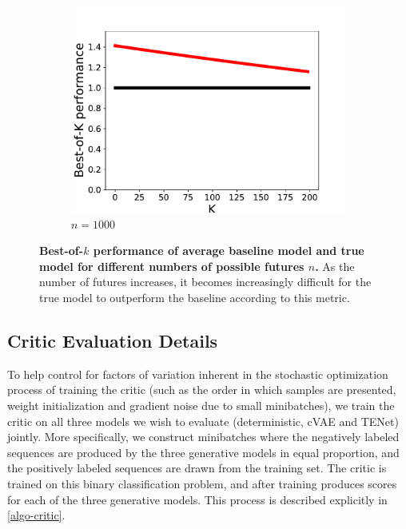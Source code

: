 \documentclass{article}
\begin{document}
\begin{appendices}
\begin{figure}
    \begin{subfigure}[b]{0.3\textwidth}
      \includegraphics[width=\textwidth]{images/best_of_k_toy_n1000.pdf}
      \caption{$n=1000$}
      \label{fig:mouse}
    \end{subfigure}
    \caption{
      \textbf{Best-of-$k$ performance of average baseline model and true model for different numbers of possible futures $n$.}
      As the number of futures increases, it becomes increasingly difficult for the true model to outperform the baseline according to this metric.}
    \label{expected-loss}
  \end{figure}

  \subsection{Critic Evaluation Details}
  \label{critic-details}

  To help control for factors of variation inherent in the stochastic optimization process of training the critic (such as the order in which samples are presented, weight initialization and gradient noise due to small minibatches), we train the critic on all three models we wish to evaluate (deterministic, cVAE and TENet) jointly.
  More specifically, we construct minibatches where the negatively labeled sequences are produced by the three generative models in equal proportion, and the positively labeled sequences are drawn from the training set.
  The critic is trained on this binary classification problem, and after training produces scores for each of the three generative models.
  This process is described explicitly in \cref{algo-critic}.


\end{appendices}
\end{document}

